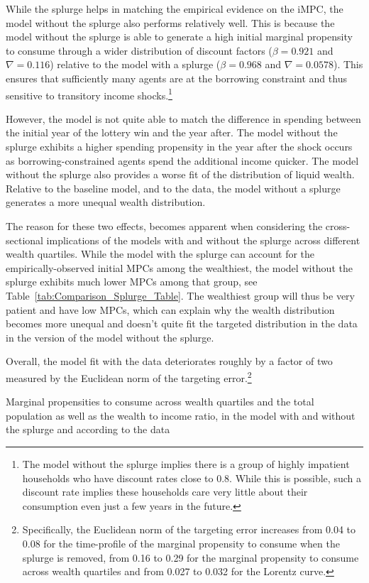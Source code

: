While the splurge helps in matching the empirical evidence on the iMPC, the model without the splurge also performs relatively well.
This is because the model without the splurge is able to generate a high initial marginal propensity to consume through a wider distribution of discount factors ($\beta = 0.921$ and $\nabla=0.116$) relative to the model with a splurge ($\beta = 0.968$ and $\nabla=0.0578$).
This ensures that sufficiently many agents are at the borrowing constraint and thus sensitive to transitory income shocks.\footnote{The model without the splurge implies there is a group of highly impatient households who have discount rates close to 0.8. While this is possible, such a discount rate implies these households care very little about their consumption even just a few years in the future.}

However, the model is not quite able to match the difference in spending between the initial year of the lottery win and the year after.
The model without the splurge exhibits a higher spending propensity in the year after the shock occurs as borrowing-constrained agents spend the additional income quicker.
The model without the splurge also provides a worse fit of the distribution of liquid wealth.
Relative to the baseline model, and to the data, the model without a splurge generates a more unequal wealth distribution.


The reason for these two effects, becomes apparent when considering the cross-sectional implications of the models with and without the splurge across different wealth quartiles.
While the model with the splurge can account for the empirically-observed initial MPCs among the wealthiest, the model without the splurge exhibits much lower MPCs among that group, see Table~\ref{tab:Comparison_Splurge_Table}.
The wealthiest group will thus be very patient and have low MPCs, which can explain why the wealth distribution becomes more unequal and doesn't quite fit the targeted distribution in the data in the version of the model without the splurge.


Overall, the model fit with the data deteriorates roughly by a factor of two measured by the Euclidean norm of the targeting error.\footnote{Specifically, the Euclidean norm of the targeting error increases from 0.04 to 0.08 for the time-profile of the marginal propensity to consume when the splurge is removed, from 0.16 to 0.29 for the marginal propensity to consume across wealth quartiles and from 0.027 to 0.032 for the Lorentz curve.} 

\begin{table}[t]
	\center
	
	\caption{Marginal propensities to consume across wealth quartiles and the total population as well as the wealth to income ratio, in the model with and without the splurge and according to the data}
	\label{tab:Comparison_Splurge_Table}
\end{table}

